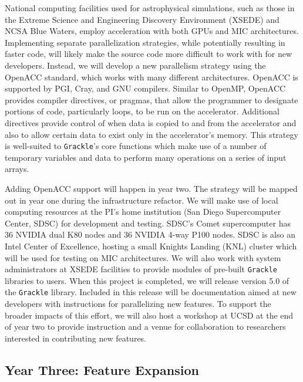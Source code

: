 \documentclass[11pt]{article}
\newcommand{\grackle}{\texttt{Grackle}}
\begin{document}
\begin{flushleft}
National computing facilities used for astrophysical simulations, such
as those in the Extreme Science and Engineering Discovery Environment
(XSEDE) and NCSA Blue Waters, employ acceleration with both GPUs and
MIC architectures.  Implementing separate parallelization strategies,
while potentially resulting in faster code, will likely make the
source code more difficult to work with for new developers.  Instead,
we will develop a new parallelism strategy using the OpenACC standard,
which works with many different architectures.  OpenACC is supported
by PGI, Cray, and GNU compilers.  Similar to OpenMP, OpenACC provides
compiler directives, or pragmas, that allow the programmer to
designate portions of code, particularly loops, to be run on the
accelerator.  Additional directives provide control of when data is
copied to and from the accelerator and also to allow certain data to
exist only in the accelerator's memory.  This strategy is well-suited
to \grackle{}'s core functions which make use of a number of temporary
variables and data to perform many operations on a series of input
arrays.

Adding OpenACC support will happen in year two.  The strategy will be
mapped out in year one during the infrastructure refactor.  We will
make use of local computing resources at the PI's home institution
(San Diego Supercomputer Center, SDSC) for development and testing.
SDSC's Comet supercomputer has 36 NVIDIA dual K80 nodes and 36 NVIDIA
4-way P100 nodes.  SDSC is also an Intel Center of Excellence, hosting
a small Knights Landing (KNL) cluster which will be used for testing
on MIC architectures.
We will also work with system administrators at XSEDE facilities to
provide modules of pre-built \grackle{} libraries to users.  When this
project is completed, we will
release version 5.0 of the \grackle{} library.  Included in this
release will be documentation aimed at new developers with
instructions for parallelizing new features.  To support the broader
impacts of this effort, we will also host a
workshop at UCSD at the end of year two to provide instruction and
a venue for collaboration to researchers interested in contributing
new features.

\subsection{Year Three: Feature Expansion}


\end{flushleft}
\end{document}
